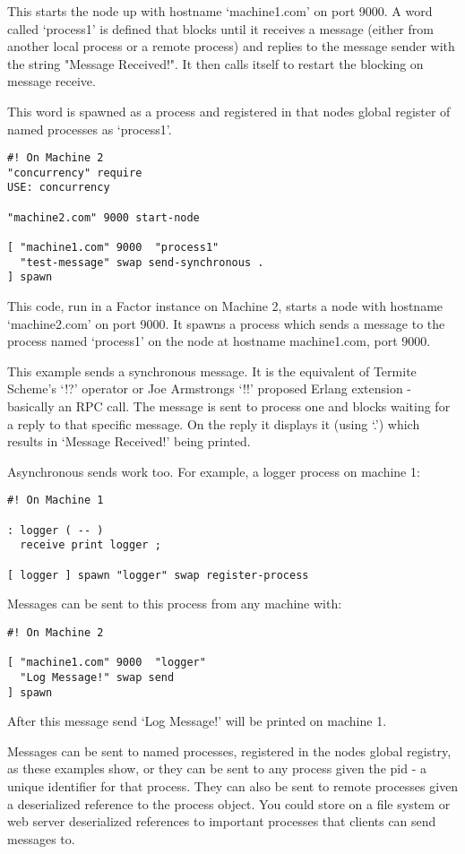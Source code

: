 This starts the node up with hostname `machine1.com' on port 9000. A
word called `process1' is defined that blocks until it receives a
message (either from another local process or a remote process) and
replies to the message sender with the string "Message Received!". It
then calls itself to restart the blocking on message receive.

This word is spawned as a process and registered in that nodes global
 register of named processes as `process1'.

\begin{verbatim}
#! On Machine 2
"concurrency" require
USE: concurrency

"machine2.com" 9000 start-node

[ "machine1.com" 9000  "process1"  
  "test-message" swap send-synchronous .
] spawn
\end{verbatim}


This code, run in a Factor instance on Machine 2, starts a node with
hostname `machine2.com' on port 9000. It spawns a process which sends
a message to the process named `process1' on the node at hostname
machine1.com, port 9000.

This example sends a synchronous message. It is the equivalent of
Termite Scheme's `!?' operator or Joe Armstrongs `!!' proposed Erlang
extension - basically an RPC call. The message is sent to process one
and blocks waiting for a reply to that specific message. On the reply
it displays it (using `.') which results in `Message Received!' being
printed.

Asynchronous sends work too. For example, a logger process on machine 1:

\begin{verbatim}
#! On Machine 1

: logger ( -- )
  receive print logger ;

[ logger ] spawn "logger" swap register-process
\end{verbatim}


Messages can be sent to this process from any machine with:

\begin{verbatim}
#! On Machine 2

[ "machine1.com" 9000  "logger"  
  "Log Message!" swap send
] spawn

\end{verbatim}

After this message send `Log Message!' will be printed on machine 1.

Messages can be sent to named processes, registered in the nodes
global registry, as these examples show, or they can be sent to any
process given the pid - a unique identifier for that process. They can
also be sent to remote processes given a deserialized reference to the
process object. You could store on a file system or web server
deserialized references to important processes that clients can send
messages to.

